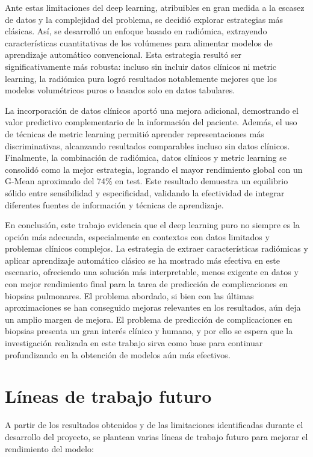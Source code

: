 Ante estas limitaciones del deep learning, atribuibles en gran medida a la escasez de datos y la complejidad del problema, se decidió explorar estrategias más clásicas. Así, se desarrolló un enfoque basado en radiómica, extrayendo características cuantitativas de los volúmenes para alimentar modelos de aprendizaje automático convencional. Esta estrategia resultó ser significativamente más robusta: incluso sin incluir datos clínicos ni metric learning, la radiómica pura logró resultados notablemente mejores que los modelos volumétricos puros o basados solo en datos tabulares.

La incorporación de datos clínicos aportó una mejora adicional, demostrando el valor predictivo complementario de la información del paciente. Además, el uso de técnicas de metric learning permitió aprender representaciones más discriminativas, alcanzando resultados comparables incluso sin datos clínicos. Finalmente, la combinación de radiómica, datos clínicos y metric learning se consolidó como la mejor estrategia, logrando el mayor rendimiento global con un G-Mean aproximado del 74\% en test. Este resultado demuestra un equilibrio sólido entre sensibilidad y especificidad, validando la efectividad de integrar diferentes fuentes de información y técnicas de aprendizaje.

En conclusión, este trabajo evidencia que el deep learning puro no siempre es la opción más adecuada, especialmente en contextos con datos limitados y problemas clínicos complejos. La estrategia de extraer características radiómicas y aplicar aprendizaje automático clásico se ha mostrado más efectiva en este escenario, ofreciendo una solución más interpretable, menos exigente en datos y con mejor rendimiento final para la tarea de predicción de complicaciones en biopsias pulmonares. El problema abordado, si bien con las últimas aproximaciones se han conseguido mejoras relevantes en los resultados, aún deja un amplio margen de mejora. El problema de predicción de complicaciones en biopsias presenta un gran interés clínico y humano, y por ello se espera que la investigación realizada en este trabajo sirva como base para continuar profundizando en la obtención de modelos aún más efectivos.

\section{Líneas de trabajo futuro}

A partir de los resultados obtenidos y de las limitaciones identificadas durante el desarrollo del proyecto, se plantean varias líneas de trabajo futuro para mejorar el rendimiento del modelo:

